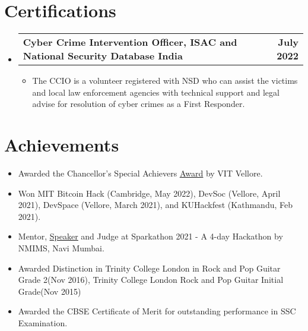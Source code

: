 \documentclass[a4paper,11pt]{article}
\makeatletter
\newcommand{\resumeItem}[1]{
  \item\small{
    {#1 \vspace{-2pt}}
  }
}
\newcommand{\resumeSubheadingg}[2]{
  \vspace{-2pt}\item
    \begin{tabular*}{1.0\textwidth}[t]{l@{\extracolsep{\fill}}r}
      \textbf{#1} & \textbf{\small #2} \\
    \end{tabular*}\vspace{-7pt}
}
\newcommand{\resumeSubHeadingListStart}{\begin{itemize}[leftmargin=0.0in, label={}]}
\newcommand{\resumeSubHeadingListEnd}{\end{itemize}}
\newcommand{\resumeItemListStart}{\begin{itemize}}
\newcommand{\resumeItemListEnd}{\end{itemize}\vspace{-5pt}}
\makeatother
\begin{document}
\section{Certifications}
  \resumeSubHeadingListStart
    \resumeSubheadingg
      {Cyber Crime Intervention Officer, ISAC and National Security Database India}{July 2022}
      \resumeItemListStart
        \resumeItem{The CCIO is a volunteer registered with NSD who can assist the victims and local law enforcement agencies with technical support and legal advise for resolution of cyber crimes as a First Responder.}
    \resumeItemListEnd
  \resumeSubHeadingListEnd

\section{Achievements}
     \resumeItemListStart
        \resumeItem{Awarded the Chancellor's Special Achievers  \underline{\href{https://everify.vit.ac.in/validate/univ/services/beca74a138465d86ed89748f53bbb412b0ed7248b60b1236fb61398a8b1e09d3c9f9fb0e8e9149988b91248637232fda}{Award}} by VIT Vellore.}
        \vspace{-6pt}
        \resumeItem{Won MIT Bitcoin Hack (Cambridge, May 2022), DevSoc (Vellore, April 2021), DevSpace (Vellore, March 2021), and KUHackfest (Kathmandu, Feb 2021).}
        \vspace{-6pt}
        \resumeItem{Mentor, \underline{\href{https://www.youtube.com/watch?v=9VDt1iRoiFY}{Speaker}} and Judge at Sparkathon 2021 - A 4-day Hackathon by NMIMS, Navi Mumbai.}
        \vspace{-6pt}
   		\resumeItem{Awarded Distinction in Trinity College London in Rock and Pop Guitar Grade 2(Nov 2016), Trinity College London Rock and Pop Guitar Initial Grade(Nov 2015)}
        \vspace{-6pt}
        \resumeItem{Awarded the CBSE Certificate of Merit for outstanding performance in SSC Examination.}
   \resumeItemListEnd
\end{document}
